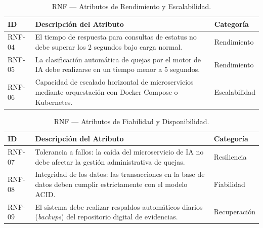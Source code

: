 \documentclass[12pt, oneside, letterpaper]{book}
\begin{document}
\begin{table}[H]
\centering
\caption{RNF — Atributos de Rendimiento y Escalabilidad.}
\begin{tabularx}{\textwidth}{@{} l L l @{}}
\toprule
{}
\textbf{\color{white} ID} & \textbf{\color{white} Descripción del Atributo} & \textbf{\color{white} Categoría} \\ \midrule
{}
RNF-04 & El tiempo de respuesta para consultas de estatus no debe superar los 2 segundos bajo carga normal. & Rendimiento \\
RNF-05 & La clasificación automática de quejas por el motor de IA debe realizarse en un tiempo menor a 5 segundos. & Rendimiento \\
RNF-06 & Capacidad de escalado horizontal de microservicios mediante orquestación con Docker Compose o Kubernetes. & Escalabilidad \\ \bottomrule
\end{tabularx}
\end{table}

\begin{table}[H]
\centering
\caption{RNF — Atributos de Fiabilidad y Disponibilidad.}
\begin{tabularx}{\textwidth}{@{} l L l @{}}
\toprule
{}
\textbf{\color{white} ID} & \textbf{\color{white} Descripción del Atributo} & \textbf{\color{white} Categoría} \\ \midrule
{}
RNF-07 & Tolerancia a fallos: la caída del microservicio de IA no debe afectar la gestión administrativa de quejas. & Resiliencia \\
RNF-08 & Integridad de los datos: las transacciones en la base de datos deben cumplir estrictamente con el modelo ACID. & Fiabilidad \\
RNF-09 & El sistema debe realizar respaldos automáticos diarios (\textit{backups}) del repositorio digital de evidencias. & Recuperación \\ \bottomrule
\end{tabularx}
\end{table}
\end{document}

